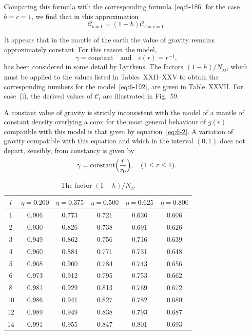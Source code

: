Comparing this formula with the corresponding formula~\eqref{eq:6-186} for the
case $b = c = 1$, we find that in this approximation
\begin{equation}\label{eq:6-191}
\mathcal{C}_{b=1} = (1-h)\mathcal{C}_{b=c=1}.
\end{equation}

It appears that in the mantle of the earth the value of gravity remains
approximately constant. For this reason the model,
\begin{equation}\label{eq:6-192}
\gamma = \text{constant}\quad\text{and}\quad c(r) = r^{-1},
\end{equation}
has been considered in some detail by Lyttkens. The factors
$(1-h)/N_{jj}$, which must be applied to the values listed in Tables~XXII--XXV to obtain the corresponding numbers for the model~\eqref{eq:6-192}, are
given in Table~XXVII. For case~(i), the derived values of $\mathcal{C}_l$ are illus\-trated in Fig.~59.

A constant value of gravity is strictly inconsistent with the model of
a mantle of constant density overlying a core; for the most general
behaviour of $g(r)$ compatible with this model is that given by equation~\eqref{eq:6-2}.
A variation of gravity compatible with this equation and which in
the interval $(0, 1)$ does not depart, sensibly, from constancy is given by
\begin{equation}\label{eq:6-193}
\gamma = \text{constant}\Bigl(\frac{r}{r_0}\Bigr),\quad(1 \leq r \leq 1).
\end{equation}

\begin{table}[ht]
\centering
\caption{The factor $(1-h)/N_{jj}$}
\label{tab:XXVII}
\begin{tabular}{c c c c c c}
\hline
$l$ & $\eta = 0.200$ & $\eta = 0.375$ & $\eta = 0.500$ & $\eta = 0.625$ & $\eta = 0.800$ \\
\hline
1 & 0.906 & 0.773 & 0.721 & 0.636 & 0.606 \\
2 & 0.930 & 0.826 & 0.738 & 0.691 & 0.626 \\
3 & 0.949 & 0.862 & 0.756 & 0.716 & 0.639 \\
4 & 0.960 & 0.884 & 0.771 & 0.731 & 0.648 \\
5 & 0.968 & 0.900 & 0.784 & 0.743 & 0.656 \\
6 & 0.973 & 0.912 & 0.795 & 0.753 & 0.662 \\
8 & 0.981 & 0.929 & 0.813 & 0.769 & 0.672 \\
10 & 0.986 & 0.941 & 0.827 & 0.782 & 0.680 \\
12 & 0.989 & 0.949 & 0.838 & 0.793 & 0.687 \\
14 & 0.991 & 0.955 & 0.847 & 0.801 & 0.693 \\
\hline
\end{tabular}
\end{table}

